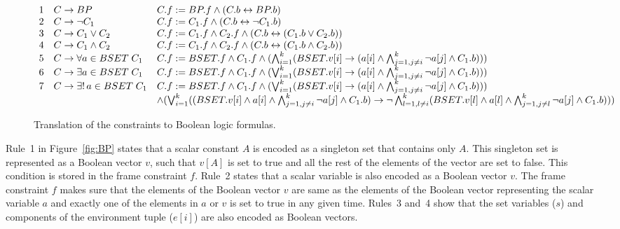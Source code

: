 \begin{figure*}[t]
\[
\begin{array}{lll}
1 & C \rightarrow  BP &
        C.f := BP.f \wedge
        (C.b \leftrightarrow BP.b) \\
2 & C \rightarrow  \neg C_1 &
        C.f := C_1.f \wedge
        (C.b \leftrightarrow \neg C_1.b) \\
3 & C \rightarrow  C_1 \vee C_2 &
        C.f := C_1.f \wedge C_2.f \wedge
        (C.b \leftrightarrow (C_1.b \vee C_2.b)) \\
4 & C \rightarrow  C_1 \wedge C_2 &
        C.f := C_1.f \wedge C_2.f \wedge
        (C.b \leftrightarrow (C_1.b \wedge C_2.b)) \\
5 & C \rightarrow  \forall a \in BSET \; C_1  &
        C.f := BSET.f \wedge C_1.f \wedge
        (\bigwedge_{i=1}^k (BSET.v[i] \rightarrow
         (a[i] \wedge \bigwedge_{j=1,j \neq i}^k \neg a[j] \wedge C_1.b))) \\
6 & C \rightarrow  \exists a \in BSET \; C_1  &
        C.f :=  BSET.f \wedge C_1.f \wedge
        (\bigvee_{i=1}^k (BSET.v[i] \rightarrow
        (a[i] \wedge \bigwedge_{j=1,j \neq i}^k \neg a[j] \wedge C_1.b))) \\
7 & C \rightarrow  \exists ! \, a \in BSET \; C_1  &
  C.f := BSET.f \wedge C_1.f \wedge
  (\bigvee_{i=1}^k (BSET.v[i] \rightarrow
   (a[i] \wedge \bigwedge_{j=1,j \neq i}^k \neg a[j] \wedge C_1.b))) \\
   & & \wedge (\bigvee_{i=1}^k ((BSET.v[i] \wedge
   a[i] \wedge \bigwedge_{j=1,j \neq i}^k \neg a[j] \wedge C_1.b) 
   \rightarrow \neg \bigwedge_{l=1, l \neq i}^k (BSET.v[l] \wedge
   a[l] \wedge \bigwedge_{j=1,j \neq l}^k \neg a[j] \wedge C_1.b)))
\end{array}
\]
\caption{Translation of the constraints to Boolean logic formulas.}
\label{fig:C}
\end{figure*}

Rule~1 in Figure~\ref{fig:BP} states that a scalar constant $A$ is
encoded as a singleton set that contains only $A$.  This singleton set
is represented as a Boolean vector $v$, such that $v[A]$ is set to
true and all the rest of the elements of the vector are set to false.
This condition is stored in the frame constraint $f$.  Rule~2 states
that a scalar variable is also encoded as a Boolean vector $v$.  The
frame constraint $f$ makes sure that the elements of the Boolean
vector $v$ are same as the elements of the Boolean vector representing
the scalar variable $a$ and exactly one of the elements in $a$ or $v$
is set to true in any given time.  Rules~3 and~4 show that the set
variables ($s$) and components of the environment tuple ($e[i]$) are
also encoded as Boolean vectors.

